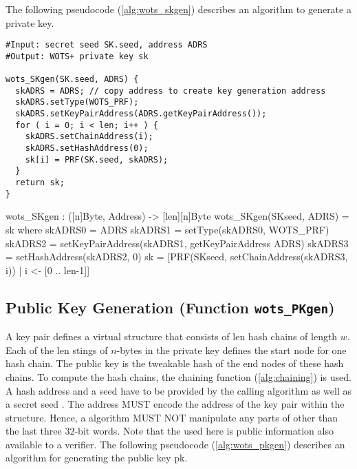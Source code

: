 The following pseudocode (\autoref{alg:wots_skgen}) describes an algorithm
to generate a \wotsp private key.

\begin{lstlisting}[label=alg:wots_skgen, language=pseudoc,
                   caption=\texttt{wots\_SKgen} -- Generating a \wotsp private key.]
#Input: secret seed SK.seed, address ADRS
#Output: WOTS+ private key sk

wots_SKgen(SK.seed, ADRS) {
  skADRS = ADRS; // copy address to create key generation address
  skADRS.setType(WOTS_PRF);
  skADRS.setKeyPairAddress(ADRS.getKeyPairAddress());
  for ( i = 0; i < len; i++ ) {
    skADRS.setChainAddress(i);
    skADRS.setHashAddress(0);
    sk[i] = PRF(SK.seed, skADRS);
  }
  return sk;
}
\end{lstlisting}

\begin{code}
  wots_SKgen : ([n]Byte, Address) -> [len][n]Byte
  wots_SKgen(SKseed, ADRS) = sk where
    skADRS0 = ADRS
    skADRS1 = setType(skADRS0, WOTS_PRF)
    skADRS2 = setKeyPairAddress(skADRS1, getKeyPairAddress ADRS)
    skADRS3 = setHashAddress(skADRS2, 0)
    sk = [PRF(SKseed, setChainAddress(skADRS3, i)) | i <- [0 .. len-1]]
\end{code}

\subsection{\wotsp Public Key Generation (Function \texttt{wots\_PKgen})}
A \wotsp key pair defines a virtual structure that consists of len hash chains of
length $w$.
Each of the len stings of $n$-bytes in the private key defines the start
node for one hash chain. The public key is the tweakable hash of the end nodes
of these hash chains.
To compute the hash chains, the chaining function
(\autoref{alg:chaining}) is used. A \wotsp hash address \adrs and a seed \pseed have
to be provided by the calling algorithm as well as a secret seed \sseed.
The address \adrs MUST encode the address of
the \wotsp key pair within the \spx structure. Hence, a \wotsp algorithm MUST NOT
manipulate any parts of \adrs other than the last three $32$-bit words.
Note that the \pseed used here is public information also available to a verifier.
The following pseudocode (\autoref{alg:wots_pkgen}) describes an algorithm for
generating the public key pk.

